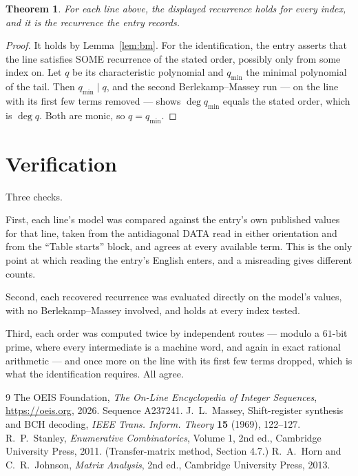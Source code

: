 \documentclass[11pt,a4paper]{article}
\theoremstyle{plain}
\newtheorem{theorem}{Theorem}
\theoremstyle{definition}
\begin{document}
\begin{theorem}
For each line above, the displayed recurrence holds for every index, and it is the recurrence
the entry records.
\end{theorem}

\begin{proof}
It holds by Lemma~\ref{lem:bm}. For the identification, the entry asserts that the line
satisfies SOME recurrence of the stated order, possibly only from some index on. Let $q$ be its
characteristic polynomial and $q_{\min}$ the minimal polynomial of the tail. Then
$q_{\min}\mid q$, and the second Berlekamp--Massey run --- on the line with its first few
terms removed --- shows $\deg q_{\min}$ equals the stated order, which is $\deg q$. Both are
monic, so $q=q_{\min}$.
\end{proof}

\section{Verification}

Three checks.

First, each line's model was compared against the entry's own published values for that line,
taken from the antidiagonal DATA read in either orientation and from the ``Table starts''
block, and agrees at every available term. This is the only point at which reading the entry's
English enters, and a misreading gives different counts.

Second, each recovered recurrence was evaluated directly on the model's values, with no
Berlekamp--Massey involved, and holds at every index tested.

Third, each order was computed twice by independent routes --- modulo a $61$-bit prime, where
every intermediate is a machine word, and again in exact rational arithmetic --- and once more
on the line with its first few terms dropped, which is what the identification requires. All
agree.

\begin{thebibliography}{9}
 The OEIS Foundation, \emph{The On-Line Encyclopedia of Integer
Sequences}, \url{https://oeis.org}, 2026. Sequence A237241.
 J.~L.~Massey, Shift-register synthesis and BCH decoding, \emph{IEEE
Trans. Inform. Theory} \textbf{15} (1969), 122--127.
 R.~P.~Stanley, \emph{Enumerative Combinatorics}, Volume 1, 2nd ed.,
Cambridge University Press, 2011. (Transfer-matrix method, Section 4.7.)
 R.~A.~Horn and C.~R.~Johnson, \emph{Matrix Analysis}, 2nd ed., Cambridge
University Press, 2013.
\end{thebibliography}
\end{document}
